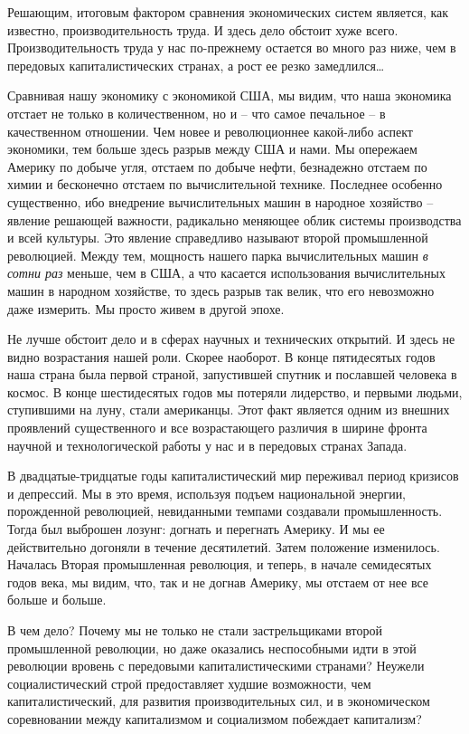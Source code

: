 \documentclass{book}
\begin{document}
Решающим, итоговым фактором сравнения экономических систем является, как известно, производительность труда. И здесь дело 
обстоит хуже всего. Производительность труда у нас по-прежнему остается во много раз ниже, чем в передовых ка­питалистических 
странах, а рост ее резко замедлился\ldots

Сравнивая нашу экономику с экономикой США, мы видим, что наша экономика отстает не только в количественном, но и -- что самое 
печальное -- в качественном отношении. Чем новее и революционнее какой-либо аспект экономики, тем больше здесь разрыв между США и 
нами. Мы опережаем Америку по добыче угля, отстаем по добыче нефти, безнадежно отстаем по химии и бесконечно отстаем по 
вычислительной технике. Пос­леднее особенно существенно, ибо внедрение вычислительных машин в народное хозяйство -- явление 
решающей важности, радикально меняющее облик системы производства и всей культуры. Это явление справедливо называют второй 
промышленной революцией. Между тем, мощность нашего парка вычислительных машин \textit{в сотни раз}  меньше, чем в США, а что касается 
использования вычислительных машин в народном хозяйстве, то здесь разрыв так велик, что его невозможно даже измерить. Мы просто 
живем в другой эпохе.

Не лучше обстоит дело и в сферах научных и технических открытий. И здесь не видно возрастания нашей роли. Скорее наоборот. В 
конце пятидесятых годов наша страна была первой страной, запустившей спутник и пославшей человека в кос­мос. В конце шестидесятых 
годов мы потеряли лидерство, и первыми людьми, ступившими на луну, стали американцы. Этот факт является одним из внешних 
проявлений существен­ного и все возрастающего различия в ширине фронта научной и технологической работы у нас и в передовых 
странах Запада.

В двадцатые-тридцатые годы капиталистический мир переживал период кризисов и депрессий. Мы в это время, исполь­зуя подъем 
национальной энергии, порожденной революцией, невиданными темпами создавали промышленность. Тогда был выброшен лозунг: догнать и 
перегнать Америку. И мы ее действительно догоняли в течение десятилетий. Затем положение изменилось. Началась Вторая 
промышленная революция, и те­перь, в начале семидесятых годов века, мы видим, что, так и не догнав Америку, мы отстаем от нее все 
больше и больше.

В чем дело? Почему мы не только не стали застрельщиками второй промышленной революции, но даже оказались неспособ­ными идти в 
этой революции вровень с передовыми капиталистическими странами? Неужели социалистический строй предоставляет худшие 
возможности, чем капиталистический, для развития производительных сил, и в экономическом соревновании между капитализмом и 
социализмом побеждает капитализм?
\end{document}

